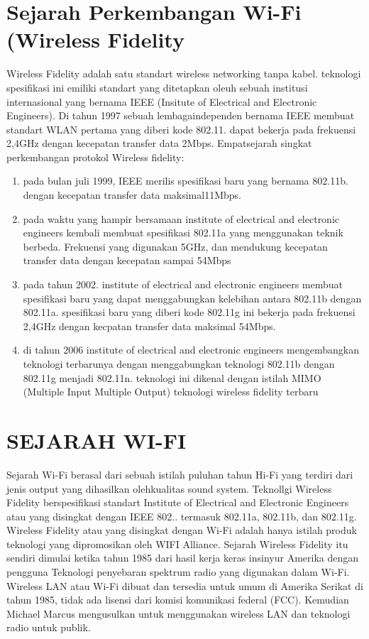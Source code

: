 \section {Sejarah Perkembangan Wi-Fi (Wireless Fidelity}
Wireless Fidelity adalah satu standart wireless networking tanpa kabel. teknologi spesifikasi ini emiliki standart yang ditetapkan oleuh sebuah institusi internasional yang bernama IEEE  (Insitute of Electrical and Electronic Engineers). Di tahun 1997 sebuah lembagaindependen bernama IEEE membuat standart WLAN pertama yang diberi kode 802.11. dapat bekerja pada frekuensi 2,4GHz dengan kecepatan transfer data 2Mbps.
Empatsejarah singkat perkembangan protokol Wireless fidelity:
\begin{enumerate}
\item pada bulan juli 1999, IEEE merilis spesifikasi baru yang bernama 802.11b. dengan kecepatan transfer data maksimal11Mbps.
\item pada waktu yang hampir bersamaan institute of electrical and electronic engineers kembali membuat spesifikasi 802.11a yang menggunakan teknik berbeda. Frekuensi yang  digunakan 5GHz, dan mendukung kecepatan transfer data dengan kecepatan sampai 54Mbps
\item pada tahun 2002. institute of electrical and electronic engineers membuat spesifikasi baru yang dapat menggabungkan kelebihan antara 802.11b dengan 802.11a. spesifikasi baru  yang diberi kode 802.11g ini bekerja pada frekuensi 2,4GHz dengan kecpatan transfer data maksimal 54Mbps.
\item di tahun 2006 institute of electrical and electronic engineers mengembangkan teknologi terbarunya dengan menggabungkan teknologi 802.11b dengan 802.11g menjadi 802.11n. teknologi ini dikenal dengan istilah MIMO (Multiple Input Multiple Output) teknologi wireless fidelity terbaru
\end{enumerate} 

\section {SEJARAH WI-FI}
Sejarah Wi-Fi berasal dari sebuah istilah puluhan tahun Hi-Fi yang terdiri dari jenis output yang dihasilkan olehkualitas sound system. Teknollgi Wireless Fidelity berspesifikasi standart Institute of Electrical and Electronic Engineers atau yang disingkat dengan IEEE 802.. termasuk 802.11a, 802.11b, dan 802.11g. Wireless Fidelity atau yang disingkat dengan Wi-Fi adalah hanya istilah produk teknologi yang dipromosikan oleh WIFI Alliance.
Sejarah Wireless Fidelity itu sendiri dimulai ketika tahun 1985 dari hasil kerja keras insinyur Amerika dengan pengguna Teknologi penyebaran spektrum radio yang digunakan dalam Wi-Fi. Wireless LAN atau Wi-Fi dibuat dan tersedia untuk umum di Amerika Serikat di tahun 1985, tidak ada lisensi dari komisi komunikasi federal (FCC). Kemudian Michael Marcus mengusulkan untuk menggunakan wireless LAN dan teknologi radio untuk publik.

